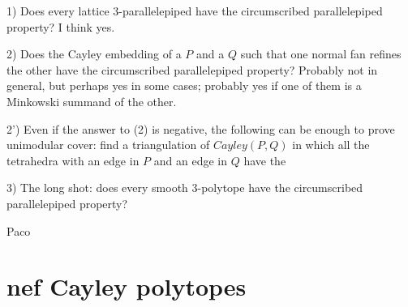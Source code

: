 \documentclass{amsart}
\theoremstyle{plain}
\theoremstyle{definition}
\begin{document}
1) Does every lattice $3$-parallelepiped have the circumscribed parallelepiped property? I think yes.

2) Does the Cayley embedding of a $P$ and a $Q$ such that one normal fan refines the other have the circumscribed parallelepiped property? Probably not in general, but perhaps yes in some cases; probably yes if one of them is a Minkowski summand of the other. 

2') Even if the answer to (2) is negative, the following can be enough to prove unimodular cover: find a triangulation of $Cayley(P,Q)$ in which all the tetrahedra with an edge in $P$ and an edge in $Q$ have the 

3) The long shot: does every smooth 3-polytope have the circumscribed parallelepiped property?

Paco


\section{nef Cayley polytopes}
\label{sec:cayley}

\begin{thebibliography}{99}


\end{thebibliography}
\end{document}
